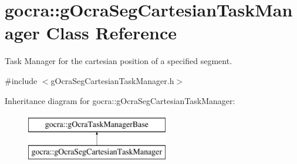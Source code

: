 \hypertarget{classgocra_1_1gOcraSegCartesianTaskManager}{}\section{gocra\+:\+:g\+Ocra\+Seg\+Cartesian\+Task\+Manager Class Reference}
\label{classgocra_1_1gOcraSegCartesianTaskManager}


Task Manager for the cartesian position of a specified segment.  




{\ttfamily \#include $<$g\+Ocra\+Seg\+Cartesian\+Task\+Manager.\+h$>$}

Inheritance diagram for gocra\+:\+:g\+Ocra\+Seg\+Cartesian\+Task\+Manager\+:\begin{figure}[H]
\begin{center}
\leavevmode
\includegraphics[height=2.000000cm]{de/d88/classgocra_1_1gOcraSegCartesianTaskManager}
\end{center}
\end{figure}
